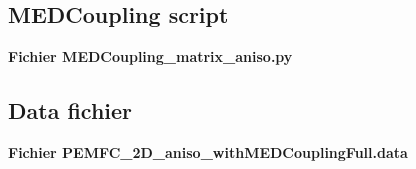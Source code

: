 \documentclass{article}
\begin{document}
	\subsection*{MEDCoupling script}
	\textbf{Fichier MEDCoupling\_matrix\_aniso.py}
	
	
	\subsection*{Data fichier}

	\textbf{Fichier PEMFC\_2D\_aniso\_withMEDCouplingFull.data}
		
\end{document}
